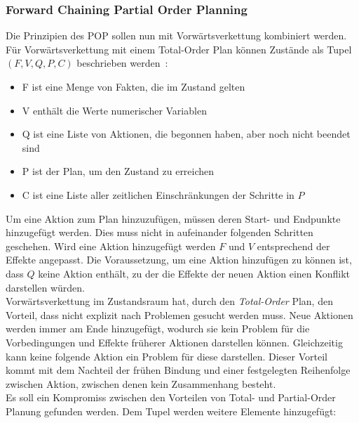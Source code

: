 \subsubsection{Forward Chaining Partial Order Planning}
Die Prinzipien des \ac{POP} sollen nun mit Vorwärtsverkettung kombiniert werden.
Für Vorwärtsverkettung mit einem Total-Order Plan können Zustände als Tupel $(F,V,Q,P,C)$ beschrieben werden~\citep{popf}:
\begin{itemize}
    \item F ist eine Menge von Fakten, die im Zustand gelten
    \item V enthält die Werte numerischer Variablen
    \item Q ist eine Liste von Aktionen, die begonnen haben, aber noch nicht beendet sind
    \item P ist der Plan, um den Zustand zu erreichen
    \item C ist eine Liste aller zeitlichen Einschränkungen der Schritte in $P$
\end{itemize}
Um eine Aktion zum Plan hinzuzufügen, müssen deren Start- und Endpunkte hinzugefügt werden.
Dies muss nicht in aufeinander folgenden Schritten geschehen.
Wird eine Aktion hinzugefügt werden $F$ und $V$ entsprechend der Effekte angepasst.
Die Voraussetzung, um eine Aktion hinzufügen zu können ist, dass $Q$ keine Aktion enthält, zu der die Effekte der neuen Aktion einen Konflikt darstellen würden.\\
Vorwärtsverkettung im Zustandsraum hat, durch den \emph{Total-Order} Plan, den Vorteil, dass nicht explizit nach Problemen gesucht werden muss.
Neue Aktionen werden immer am Ende hinzugefügt, wodurch sie kein Problem für die Vorbedingungen und Effekte früherer Aktionen darstellen können.
Gleichzeitig kann keine folgende Aktion ein Problem für diese darstellen.
Dieser Vorteil kommt mit dem Nachteil der frühen Bindung und einer festgelegten Reihenfolge zwischen Aktion, zwischen denen kein Zusammenhang besteht.\\
Es soll ein Kompromiss zwischen den Vorteilen von Total- und Partial-Order Planung gefunden werden.
Dem Tupel werden weitere Elemente hinzugefügt:
